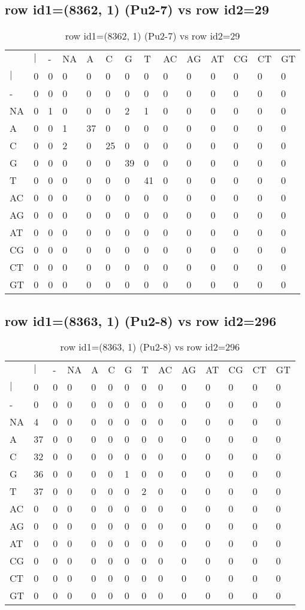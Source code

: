 \subsection{row id1=(8362, 1) (Pu2-7) vs row id2=29}
\begin{center}
\begin{longtable}{|l|l|l|l|l|l|l|l|l|l|l|l|l|l|}
\caption{row id1=(8362, 1) (Pu2-7) vs row id2=29} \label{table_dm584}\\
\hline
\\
\hline
&$|$&-&NA&A&C&G&T&AC&AG&AT&CG&CT&GT\\
$|$&0&0&0&0&0&0&0&0&0&0&0&0&0\\
-&0&0&0&0&0&0&0&0&0&0&0&0&0\\
NA&0&1&0&0&0&2&1&0&0&0&0&0&0\\
A&0&0&1&37&0&0&0&0&0&0&0&0&0\\
C&0&0&2&0&25&0&0&0&0&0&0&0&0\\
G&0&0&0&0&0&39&0&0&0&0&0&0&0\\
T&0&0&0&0&0&0&41&0&0&0&0&0&0\\
AC&0&0&0&0&0&0&0&0&0&0&0&0&0\\
AG&0&0&0&0&0&0&0&0&0&0&0&0&0\\
AT&0&0&0&0&0&0&0&0&0&0&0&0&0\\
CG&0&0&0&0&0&0&0&0&0&0&0&0&0\\
CT&0&0&0&0&0&0&0&0&0&0&0&0&0\\
GT&0&0&0&0&0&0&0&0&0&0&0&0&0\\
\hline
\end{longtable}
\end{center}

\subsection{row id1=(8363, 1) (Pu2-8) vs row id2=296}
\begin{center}
\begin{longtable}{|l|l|l|l|l|l|l|l|l|l|l|l|l|l|}
\caption{row id1=(8363, 1) (Pu2-8) vs row id2=296} \label{table_dm586}\\
\hline
\\
\hline
&$|$&-&NA&A&C&G&T&AC&AG&AT&CG&CT&GT\\
$|$&0&0&0&0&0&0&0&0&0&0&0&0&0\\
-&0&0&0&0&0&0&0&0&0&0&0&0&0\\
NA&4&0&0&0&0&0&0&0&0&0&0&0&0\\
A&37&0&0&0&0&0&0&0&0&0&0&0&0\\
C&32&0&0&0&0&0&0&0&0&0&0&0&0\\
G&36&0&0&0&0&1&0&0&0&0&0&0&0\\
T&37&0&0&0&0&0&2&0&0&0&0&0&0\\
AC&0&0&0&0&0&0&0&0&0&0&0&0&0\\
AG&0&0&0&0&0&0&0&0&0&0&0&0&0\\
AT&0&0&0&0&0&0&0&0&0&0&0&0&0\\
CG&0&0&0&0&0&0&0&0&0&0&0&0&0\\
CT&0&0&0&0&0&0&0&0&0&0&0&0&0\\
GT&0&0&0&0&0&0&0&0&0&0&0&0&0\\
\hline
\end{longtable}
\end{center}

